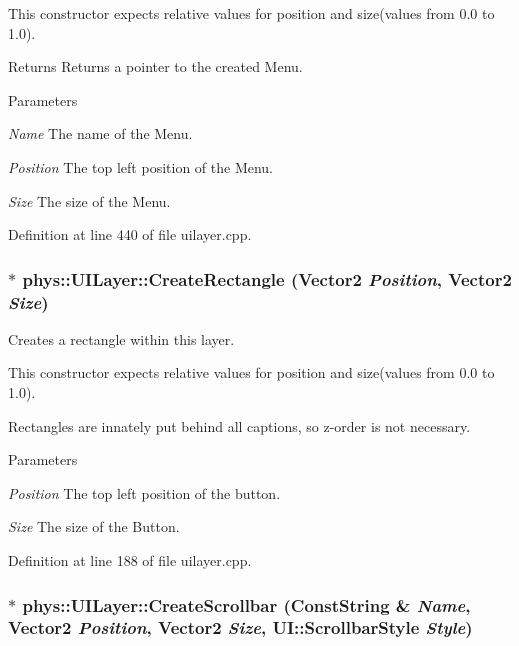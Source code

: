 This constructor expects relative values for position and size(values from 0.0 to 1.0). \begin{DoxyReturn}{Returns}
Returns a pointer to the created Menu. 
\end{DoxyReturn}

\begin{DoxyParams}{Parameters}
\item[{\em Name}]The name of the Menu. \item[{\em Position}]The top left position of the Menu. \item[{\em Size}]The size of the Menu. \end{DoxyParams}


Definition at line 440 of file uilayer.cpp.

\hypertarget{classphys_1_1UILayer_ac3a40183555b370737d6f6954ea0f8e3}{
\subsubsection[{CreateRectangle}]{ $\ast$ phys::UILayer::CreateRectangle ({\bf Vector2} {\em Position}, \/  {\bf Vector2} {\em Size})}}
\label{da/d48/classphys_1_1UILayer_ac3a40183555b370737d6f6954ea0f8e3}


Creates a rectangle within this layer. 

This constructor expects relative values for position and size(values from 0.0 to 1.0). \par
 Rectangles are innately put behind all captions, so z-\/order is not necessary. 
\begin{DoxyParams}{Parameters}
\item[{\em Position}]The top left position of the button. \item[{\em Size}]The size of the Button. \end{DoxyParams}


Definition at line 188 of file uilayer.cpp.

\hypertarget{classphys_1_1UILayer_a50643d43ad6e251aafc817e22c2d6a19}{
\subsubsection[{CreateScrollbar}]{ $\ast$ phys::UILayer::CreateScrollbar ({\bf ConstString} \& {\em Name}, \/  {\bf Vector2} {\em Position}, \/  {\bf Vector2} {\em Size}, \/  UI::ScrollbarStyle {\em Style})}}
\label{da/d48/classphys_1_1UILayer_a50643d43ad6e251aafc817e22c2d6a19}


